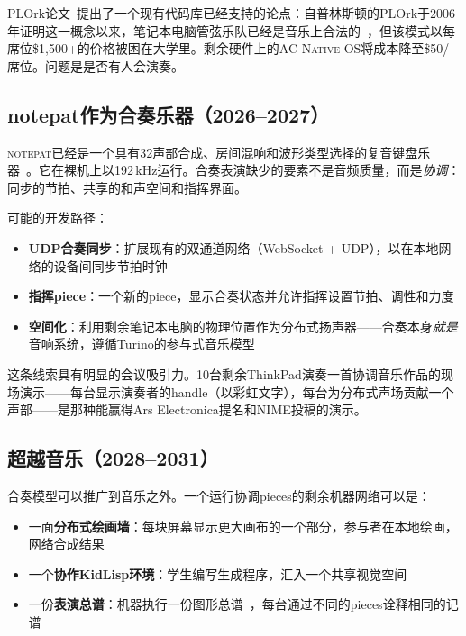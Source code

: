 \documentclass[10pt,letterpaper,twocolumn]{article}
\newcommand{\acos}{\textsc{AC Native OS}}
\newcommand{\np}{\textsc{notepat}}
\begin{document}
PLOrk论文~\citep{scudder2026plork}提出了一个现有代码库已经支持的论点：自普林斯顿的PLOrk于2006年证明这一概念以来，笔记本电脑管弦乐队已经是音乐上合法的~\citep{trueman2006plork}，但该模式以每席位\$1,500+的价格被困在大学里。剩余硬件上的\acos{}将成本降至\$50/席位。问题是是否有人会演奏。

\subsection{notepat作为合奏乐器（2026--2027）}

\np{}已经是一个具有32声部合成、房间混响和波形类型选择的复音键盘乐器~\citep{scudder2026notepat}。它在裸机上以192\,kHz运行。合奏表演缺少的要素不是音频质量，而是\emph{协调}：同步的节拍、共享的和声空间和指挥界面。

可能的开发路径：

\begin{itemize}
  \item \textbf{UDP合奏同步}：扩展现有的双通道网络（WebSocket + UDP），以在本地网络的设备间同步节拍时钟
  \item \textbf{指挥piece}：一个新的piece，显示合奏状态并允许指挥设置节拍、调性和力度
  \item \textbf{空间化}：利用剩余笔记本电脑的物理位置作为分布式扬声器——合奏本身\emph{就是}音响系统，遵循Turino的参与式音乐模型~\citep{turino2008music}
\end{itemize}

这条线索具有明显的会议吸引力。10台剩余ThinkPad演奏一首协调音乐作品的现场演示——每台显示演奏者的handle（以彩虹文字），每台为分布式声场贡献一个声部——是那种能赢得Ars Electronica提名和NIME投稿的演示。

\subsection{超越音乐（2028--2031）}

合奏模型可以推广到音乐之外。一个运行协调pieces的剩余机器网络可以是：

\begin{itemize}
  \item 一面\textbf{分布式绘画墙}：每块屏幕显示更大画布的一个部分，参与者在本地绘画，网络合成结果
  \item 一个\textbf{协作KidLisp环境}：学生编写生成程序，汇入一个共享视觉空间
  \item 一份\textbf{表演总谱}：机器执行一份图形总谱~\citep{scudder2026pieces}，每台通过不同的pieces诠释相同的记谱
\end{itemize}
\end{document}
